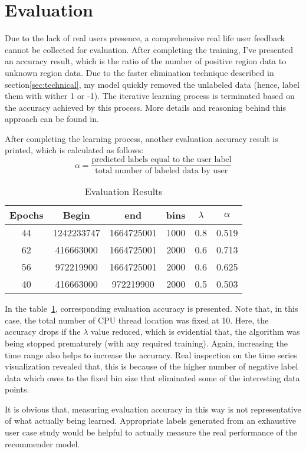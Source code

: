 \section{Evaluation}
\label{sec:evaluation}
Due to the lack of real users presence, a comprehensive real life user feedback cannot be collected for evaluation. After completing the training, I've
presented an accuracy result, which is the ratio of the number of positive region data to unknown region data. Due to the faster elimination technique
described in section\ref{sec:technical}, my model quickly removed the unlabeled data (hence, label them with wither 1 or -1). The iterative learning process
is terminated based on the accuracy achieved by this process. More details and reasoning behind this approach can be found in\cite{huang2018optimization}.
%
\par
After completing the learning process, another evaluation accuracy result is printed, which is calculated as follows:
\[
    \alpha = \dfrac{\text{predicted labels equal to the user label}}{\text{total number of labeled data by user}}
\]
%
%
\begin{table}[h!]
    \begin{center}
        \caption{Evaluation Results}
        \label{tab:table1}
        \begin{tabular}{c|c|c|c|c|c} %
            \textbf{Epochs} & \textbf{Begin} & \textbf{end} & \textbf{bins} & \textbf{$\lambda$} & \textbf{$\alpha$}\\
            \hline
            44 & 1242233747 & 1664725001 & 1000 & 0.8 & 0.519\\
            62 & 416663000 & 1664725001 & 2000 & 0.6 & 0.713\\
            56 & 972219900 & 1664725001 & 2000 & 0.6 & 0.625\\
            40 & 416663000 & 972219900 & 2000 & 0.5 & 0.503\\
        \end{tabular}
    \end{center}
\end{table}
%
%
In the table~\ref{tab:table1}, corresponding evaluation accuracy is presented. Note that, in this case, the total number of CPU thread location was fixed at
10. Here, the accuracy drops if the $\lambda$ value reduced, which is evidential that, the algorithm was being stopped prematurely (with any required
training). Again, increasing the time range also helps to increase the accuracy. Real inspection on the time series visualization revealed that, this is because
of the higher number of negative label data which owes to the fixed bin size that eliminated some of the interesting data points.
\par
It is obvious that, measuring evaluation accuracy in this way is not representative of what actually being learned. Appropriate labels generated from an
exhaustive user case study would be helpful to actually measure the real performance of the recommender model.
